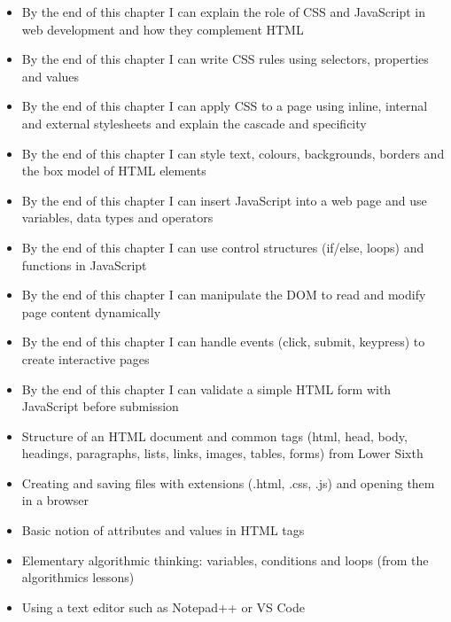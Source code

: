 \documentclass[11pt]{article}
\begin{document}
\begin{objectifs}
\begin{itemize}
\item By the end of this chapter I can explain the role of CSS and JavaScript in web development and how they complement HTML
\item By the end of this chapter I can write CSS rules using selectors, properties and values
\item By the end of this chapter I can apply CSS to a page using inline, internal and external stylesheets and explain the cascade and specificity
\item By the end of this chapter I can style text, colours, backgrounds, borders and the box model of HTML elements
\item By the end of this chapter I can insert JavaScript into a web page and use variables, data types and operators
\item By the end of this chapter I can use control structures (if/else, loops) and functions in JavaScript
\item By the end of this chapter I can manipulate the DOM to read and modify page content dynamically
\item By the end of this chapter I can handle events (click, submit, keypress) to create interactive pages
\item By the end of this chapter I can validate a simple HTML form with JavaScript before submission
\end{itemize}
\end{objectifs}

\begin{prerequis}
\begin{itemize}
\item Structure of an HTML document and common tags (html, head, body, headings, paragraphs, lists, links, images, tables, forms) from Lower Sixth
\item Creating and saving files with extensions (.html, .css, .js) and opening them in a browser
\item Basic notion of attributes and values in HTML tags
\item Elementary algorithmic thinking: variables, conditions and loops (from the algorithmics lessons)
\item Using a text editor such as Notepad++ or VS Code
\end{itemize}
\end{prerequis}

\newpage
\end{document}
